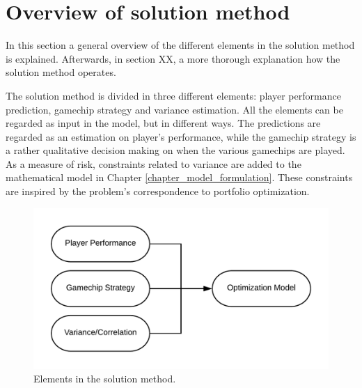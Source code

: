 \section{Overview of solution method}

In this section a general overview of the different elements in the solution method is explained. Afterwards, in section XX, a more thorough explanation how the solution method operates. 

\newpar

The solution method is divided in three different elements: player performance prediction, gamechip strategy and variance estimation. All the elements can be regarded as input in the model, but in different ways. The predictions are regarded as an estimation on player's performance, while the gamechip strategy is a rather qualitative decision making on when the various gamechips are played. As a measure of risk, constraints related to variance are added to the mathematical model in Chapter \ref{chapter_model_formulation}. These constraints are inspired by the problem's correspondence to portfolio optimization. 

\begin{figure}[H]
    \centering
    \includegraphics[scale = 0.65]{fig/chapter_5/Solution_Method.png}
    \caption{Elements in the solution method.}
    \label{fig:solution}
\end{figure}

\newpar

